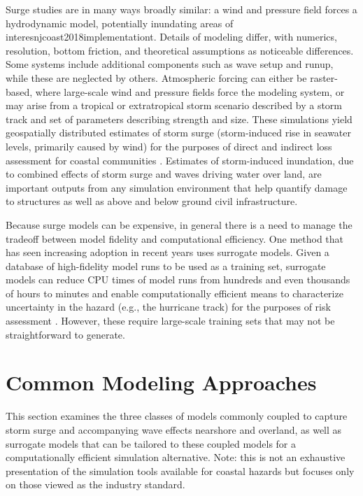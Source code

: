 Surge studies are in many ways broadly similar: a wind and pressure field forces a hydrodynamic model, potentially inundating areas of interesnjcoast2018implementationt. Details of modeling differ, with numerics, resolution, bottom friction, and theoretical assumptions as noticeable differences. Some systems include additional components such as wave setup and runup, while these are neglected by others. Atmospheric forcing can either be raster-based, where large-scale wind and pressure fields force the modeling system, or may arise from a tropical or extratropical storm scenario described by a storm track and set of parameters describing strength and size. These simulations yield geospatially distributed estimates of storm surge (storm-induced rise in seawater levels, primarily caused by wind) for the purposes of direct and indirect loss assessment for coastal communities \citep{jacob2011responding}. Estimates of storm-induced inundation, due to combined effects of storm surge and waves driving water over land, are important outputs from any simulation environment that help quantify damage to structures as well as above and below ground civil infrastructure.

Because surge models can be expensive, in general there is a need to manage the tradeoff between model fidelity and computational efficiency. One method that has seen increasing adoption in recent years uses surrogate models. Given a database of high-fidelity model runs to be used as a training set, surrogate models can reduce CPU times of model runs from hundreds and even thousands of hours to minutes and enable computationally efficient means to characterize uncertainty in the hazard (e.g., the hurricane track) for the purposes of risk assessment \citep{kijewski-correaCyberEye2014}. However, these require large-scale training sets that may not be straightforward to generate. 

\section{Common Modeling Approaches}
\label{sec:storm_surge_methods}

This section examines the three classes of models commonly coupled to capture storm surge and accompanying wave effects nearshore and overland, as well as surrogate models that can be tailored to these coupled models for a computationally efficient simulation alternative. Note: this is not an exhaustive presentation of the simulation tools available for coastal hazards but focuses only on those viewed as the industry standard. 

